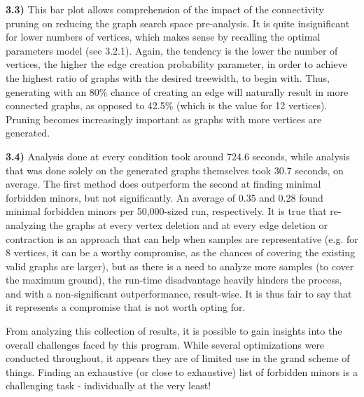 \textbf{3.3)} This bar plot allows comprehension of the impact of the connectivity pruning on reducing the graph search space pre-analysis. It is quite insignificant for lower numbers of vertices, which makes sense by recalling the optimal parameters model (see 3.2.1). Again, the tendency is the lower the number of vertices, the higher the edge creation probability parameter, in order to achieve the highest ratio of graphs with the desired treewidth, to begin with. Thus, generating with an 80\% chance of creating an edge will naturally result in more connected graphs, as opposed to 42.5\% (which is the value for 12 vertices). Pruning becomes increasingly important as graphs with more vertices are generated.

\textbf{3.4)} Analysis done at every condition took around 724.6 seconds, while analysis that was done solely on the generated graphs themselves took 30.7 seconds, on average. The first method does outperform the second at finding minimal forbidden minors, but not significantly. An average of 0.35 and 0.28 found minimal forbidden minors per 50,000-sized run, respectively. It is true that re-analyzing the graphs at every vertex deletion and at every edge deletion or contraction is an approach that can help when samples are representative (e.g. for 8 vertices, it can be a worthy compromise, as the chances of covering the existing valid graphs are larger), but as there is a need to analyze more samples (to cover the maximum ground), the run-time disadvantage heavily hinders the process, and with a non-significant outperformance, result-wise. It is thus fair to say that it represents a compromise that is not worth opting for.

From analyzing this collection of results, it is possible to gain insights into the overall challenges faced by this program. While several optimizations were conducted throughout, it appears they are of limited use in the grand scheme of things. Finding an exhaustive (or close to exhaustive) list of forbidden minors is a challenging task - individually at the very least!